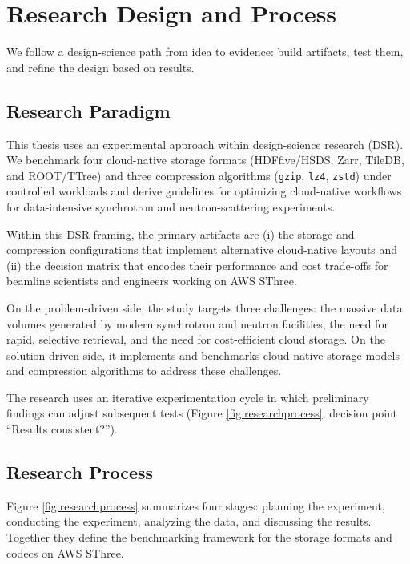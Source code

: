 \documentclass[nomenclature, english, bibtex]{kththesis}
\numberwithin{listing}{chapter}
\begin{document}
\section{Research Design and Process}
\label{sec:methods-design-process}
We follow a design-science path from idea to evidence: build artifacts, test them, and refine the design based on results.

\subsection{Research Paradigm}
\label{sec:researchParadigm}
This thesis uses an experimental approach within design-science research (\gls{DSR}). We benchmark four cloud-native storage formats (\gls{HDFfive}/\gls{HSDS}, Zarr, TileDB, and \gls{ROOT}/\gls{TTree}) and three compression algorithms (\texttt{gzip}, \texttt{lz4}, \texttt{zstd}) under controlled workloads and derive guidelines for optimizing cloud-native workflows for data-intensive synchrotron and neutron-scattering experiments.

Within this \gls{DSR} framing, the primary artifacts are (i) the storage and compression configurations that implement alternative cloud-native layouts and (ii) the decision matrix that encodes their performance and cost trade-offs for beamline scientists and engineers working on \gls{AWS} \gls{SThree}.

On the problem-driven side, the study targets three challenges: the massive data volumes generated by modern synchrotron and neutron facilities, the need for rapid, selective retrieval, and the need for cost-efficient cloud storage. On the solution-driven side, it implements and benchmarks cloud-native storage models and compression algorithms to address these challenges.

The research uses an iterative experimentation cycle in which preliminary findings can adjust subsequent tests (Figure \ref{fig:researchprocess}, decision point “Results consistent?”).

\subsection{Research Process}
\label{sec:researchProcess}
Figure \ref{fig:researchprocess} summarizes four stages: planning the experiment, conducting the experiment, analyzing the data, and discussing the results. Together they define the benchmarking framework for the storage formats and codecs on \gls{AWS} \gls{SThree}.
\end{document}
